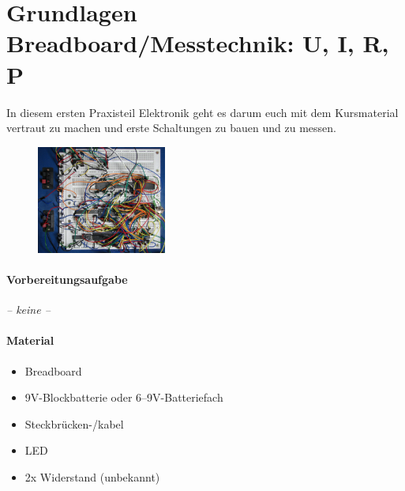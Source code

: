 
\clearpage

\section{Grundlagen Breadboard/Messtechnik: U, I, R, P}

In diesem ersten Praxisteil Elektronik geht es darum euch mit dem Kursmaterial
vertraut zu machen und erste Schaltungen zu bauen und zu messen.


{
  \begin{figure}
    \includegraphics[width=0.38\textwidth]{Breadboard_complex.jpg}
  \end{figure}

  \paragraph{Vorbereitungsaufgabe}

  \emph{-- keine --}

  \paragraph{Material}

  \begin{itemize}
    \item Breadboard
    \item 9V-Blockbatterie oder 6--9V-Batteriefach
    \item Steckbrücken-/kabel
    \item LED
    \item 2x Widerstand (unbekannt) 
  \end{itemize}
}

